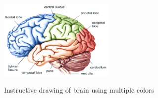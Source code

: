 \begin{figure}[ht]
\caption{Instructive drawing of brain using multiple colors}
\centering
\includegraphics[width=0.5\textwidth]{brainparts.png}
\label{fig:brainparts}
\end{figure}

